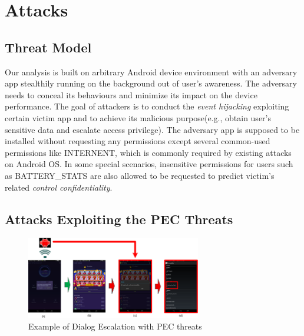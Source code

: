 \section{Attacks}


\subsection{Threat Model}
Our analysis is built on arbitrary Android device environment with an adversary app stealthily running on the background out of user's awareness.  The adversary needs to conceal its behaviours and minimize its impact on the device performance. The goal of attackers is to conduct the \emph{event hijacking} exploiting certain victim app and to achieve its malicious purpose(e.g., obtain user's sensitive data and escalate access privilege). The adversary app is supposed to be installed without requesting any permissions except several common-used permissions like INTERNENT, which is commonly required by existing attacks on Android OS\cite{chen2014peeking}\cite{ren2015towards}. In some special scenarios, insensitive permissions for users such as BATTERY\_STATS are also allowed to be requested to predict victim's related \emph{control confidentiality}. 


\subsection{Attacks Exploiting the PEC Threats}

\begin{figure}
\centering
\includegraphics[width = 3.0in]{pic2.png}
\caption{\label{}Example of Dialog Escalation with PEC threats}
\end{figure}

